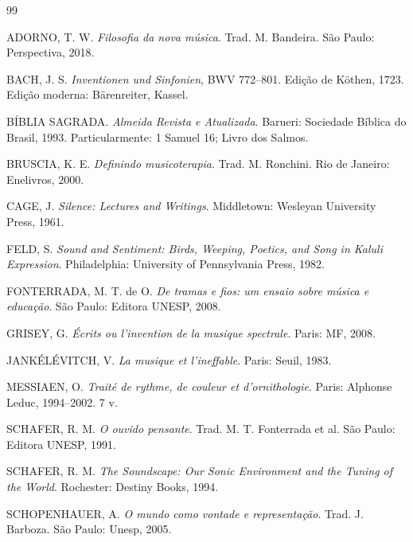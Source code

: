 \documentclass[12pt,a4paper]{article}
\begin{document}
\renewcommand{\refname}{Referências}
\begin{thebibliography}{99}

ADORNO, T. W. \textit{Filosofia da nova música}. Trad. M. Bandeira. São Paulo: Perspectiva, 2018.

BACH, J. S. \textit{Inventionen und Sinfonien}, BWV 772--801. Edição de Köthen, 1723. Edição moderna: Bärenreiter, Kassel.

BÍBLIA SAGRADA. \textit{Almeida Revista e Atualizada}. Barueri: Sociedade Bíblica do Brasil, 1993. Particularmente: 1 Samuel 16; Livro dos Salmos.

BRUSCIA, K. E. \textit{Definindo musicoterapia}. Trad. M. Ronchini. Rio de Janeiro: Enelivros, 2000.

CAGE, J. \textit{Silence: Lectures and Writings}. Middletown: Wesleyan University Press, 1961.

FELD, S. \textit{Sound and Sentiment: Birds, Weeping, Poetics, and Song in Kaluli Expression}. Philadelphia: University of Pennsylvania Press, 1982.

FONTERRADA, M. T. de O. \textit{De tramas e fios: um ensaio sobre música e educação}. São Paulo: Editora UNESP, 2008.

GRISEY, G. \textit{Écrits ou l'invention de la musique spectrale}. Paris: MF, 2008.

JANKÉLÉVITCH, V. \textit{La musique et l'ineffable}. Paris: Seuil, 1983.

MESSIAEN, O. \textit{Traité de rythme, de couleur et d'ornithologie}. Paris: Alphonse Leduc, 1994--2002. 7 v.

SCHAFER, R. M. \textit{O ouvido pensante}. Trad. M. T. Fonterrada et al. São Paulo: Editora UNESP, 1991.

SCHAFER, R. M. \textit{The Soundscape: Our Sonic Environment and the Tuning of the World}. Rochester: Destiny Books, 1994.

SCHOPENHAUER, A. \textit{O mundo como vontade e representação}. Trad. J. Barboza. São Paulo: Unesp, 2005.


\end{thebibliography}
\end{document}
